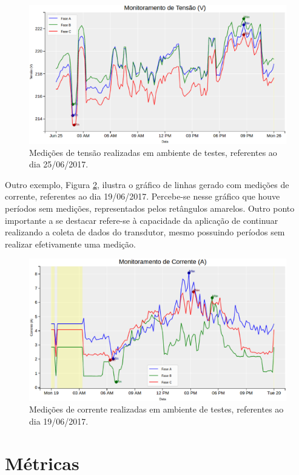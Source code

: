 \begin{figure}[!h]
    \centering
    \includegraphics[keepaspectratio=true,scale=0.5]{figuras/graph_1.eps}
    \caption{Medições de tensão realizadas em ambiente de testes, referentes ao dia 25/06/2017.}
    \label{graph_1}
\end{figure}

Outro exemplo, Figura \ref{graph_2}, ilustra o gráfico de linhas gerado com medições de corrente, referentes ao dia 19/06/2017. Percebe-se nesse gráfico que houve períodos sem medições, representados pelos retângulos amarelos. Outro ponto importante a se destacar refere-se à capacidade da aplicação de continuar realizando a coleta de dados do transdutor, mesmo possuindo períodos sem realizar efetivamente uma medição.

\begin{figure}[!h]
    \centering
    \includegraphics[keepaspectratio=true,scale=0.5]{figuras/graph_2.eps}
    \caption{Medições de corrente realizadas em ambiente de testes, referentes ao dia 19/06/2017.}
    \label{graph_2}
\end{figure}

\section{Métricas}
